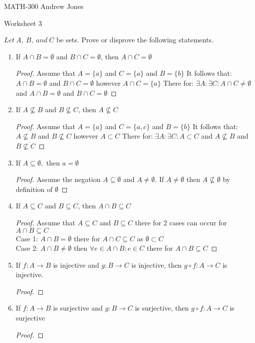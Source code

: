 \documentclass{article}
\begin{document}
  MATH-300 \hfill Andrew Jones
  \begin{center}
  {\huge Worksheet 3}
  \end{center}
  $Let\ A,\ B,\ and\ C$ be sets. Prove or disprove the following statements. \\
  \begin{enumerate}
  \item If $A\cap B = \emptyset$ and $B\cap C = \emptyset$, then $A\cap C = \emptyset$
    \begin{proof}
      Assume that $A = \{a\}$ and $C = \{a\}$ and $B = \{b\}$ 
      It follows that: $A\cap B = \emptyset$ and $B\cap C = \emptyset$ however $A\cap C = \{a\}$
      There for: $\exists A: \exists C: A\cap C \neq \emptyset$ and $A\cap B = \emptyset$ and $B\cap C = \emptyset$  
    \end{proof}
  \item If $A\not\subseteq B$ and $B\not\subseteq C$, then $A\not\subseteq C$ 
    \begin{proof}
      Assume that $A = \{a\}$ and $C = \{a, c\}$ and $B = \{b\}$ 
      It follows that: $A\not\subseteq B$ and $B\not\subseteq C$ however $A\subset C$
      There for: $\exists A: \exists C: A\subset C$ and $A\not\subseteq B$ and $B\not\subseteq C$  
    \end{proof}
  \item If $A\subseteq \emptyset,$ then $a= \emptyset$ 
    \begin{proof}
      Assume the negation $A\subseteq \emptyset$ and $A \neq \emptyset$.
      If $A \neq \emptyset$ then $A\not\subseteq \emptyset$ by definition of $\emptyset$ 
    \end{proof}
  \item If $A\subseteq C$ and $B\subseteq C$, then $A\cap B\subseteq C$
    \begin{proof}
     Assume that $A\subseteq C$ and $B\subseteq C$ there for 2 cases can occur for $A\cap B\subseteq C$ \\
     Case 1: $A\cap B = \emptyset$ there for $A\cap C\subseteq C$ as $\emptyset \subset C$ \\
     Case 2: $A\cap B \neq \emptyset$ then $\forall e\in A\cap B: e\in C$ there for $A\cap B \subseteq C$
    \end{proof}
  \item If $f : A\to B$ is injective and $g : B\to C$ is injective, then $g \circ f : A\to C$ is injective. 
    \begin{proof}

    \end{proof}
  \item If $f : A\to B$ is surjective and $g : B\to C$ is surjective, then $g \circ f : A\to C$ is surjective 
    \begin{proof}


\end{proof}
\end{enumerate}
\end{document}

